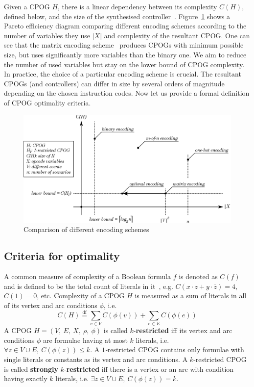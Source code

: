 Given a CPOG $H$, there is a linear dependency between its complexity
$C(H)$, defined below, and the size of the synthesised controller~\cite{2010_mokhov_ieee}.
Figure~\ref{fig-Size-of-specification} shows a Pareto efficiency diagram comparing
different encoding schemes according to the number of variables they
use $|X|$ and complexity of the resultant CPOG. One can see that
the matrix encoding scheme~\cite{2009_mokhov_phd} produces CPOGs
with minimum possible size, but uses significantly more variables
than the binary one. We aim to reduce the number of used variables
but stay on the lower bound of CPOG complexity. In practice, the choice
of a particular encoding scheme is crucial. The resultant CPOGs (and
controllers) can differ in size by several orders of magnitude depending
on the chosen instruction codes. Now let us provide a formal definition
of CPOG optimality criteria.

\begin{figure}[h]
\begin{centering}
\includegraphics[width=0.75\columnwidth]{fig/encodings}

\par\end{centering}

\caption{Comparison of different encoding schemes\label{fig-Size-of-specification}}
\end{figure}

\subsection{Criteria for optimality\label{sec:Criteria-for-optimality}}

A common measure of complexity of a Boolean formula $f$ is denoted
as $C(f)$ and is defined to be the total count of literals in it~\cite{1987_wegener_book},
e.g. $C(x\cdot z+y\cdot\overline{z})=4$, $C(1)=0$, etc. Complexity
of a CPOG $H$ is measured as a sum of literals in all of its vertex
and arc conditions $\phi$, i.e.
\[
C(H)\overset{\textrm{df}}{=}\sum_{v\in V}C(\phi(v))+\sum_{e\in E}C(\phi(e))
\]
A CPOG $H=(V,\ E,\ X,\ \rho,\ \phi)$ is called $k$-\textbf{restricted}
iff its vertex and arc conditions $\phi$ are formulae having at most
$k$ literals, i.e. $\forall z\in V\cup E,\ C(\phi(z))\le k$. A \emph{$1$-}restricted
CPOG contains only formulae with single literals or constants as its
vertex and arc conditions. A $k$-restricted CPOG is called \textbf{strongly}
$k$-\textbf{restricted} iff there is a vertex or an arc with condition
having exactly $k$ literals, i.e. $\exists z\in V\cup E,\ C(\phi(z))=k$.

